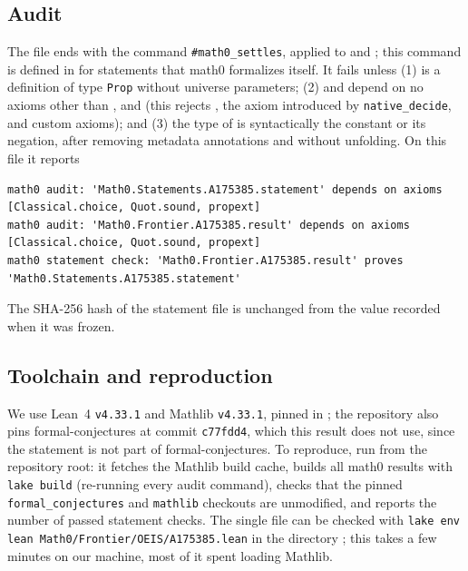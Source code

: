 \documentclass[11pt]{amsart}
\theoremstyle{plain}
\theoremstyle{definition}
\begin{document}
\subsection*{Audit}
The file ends with the command \texttt{\#math0\_settles}, applied to  and ; this command is defined in  for statements that math0 formalizes itself.
It fails unless (1)  is a definition of type \texttt{Prop} without universe parameters; (2)  and  depend on no axioms other than ,  and  (this rejects , the axiom  introduced by \texttt{native\_decide}, and custom axioms); and (3) the type of  is syntactically the constant  or its negation, after removing metadata annotations and without unfolding.
On this file it reports
\begin{lstlisting}
math0 audit: 'Math0.Statements.A175385.statement' depends on axioms [Classical.choice, Quot.sound, propext]
math0 audit: 'Math0.Frontier.A175385.result' depends on axioms [Classical.choice, Quot.sound, propext]
math0 statement check: 'Math0.Frontier.A175385.result' proves 'Math0.Statements.A175385.statement'
\end{lstlisting}
The SHA-256 hash of the statement file is unchanged from the value recorded when it was frozen.

\subsection*{Toolchain and reproduction}
We use Lean~4 \cite{Lean4} \texttt{v4.33.1} and Mathlib \cite{Mathlib} \texttt{v4.33.1}, pinned in ; the repository also pins formal-conjectures \cite{FC} at commit \texttt{c77fdd4}, which this result does not use, since the statement is not part of formal-conjectures.
To reproduce, run  from the repository root: it fetches the Mathlib build cache, builds all math0 results with \texttt{lake build} (re-running every audit command), checks that the pinned \texttt{formal\_conjectures} and \texttt{mathlib} checkouts are unmodified, and reports the number of passed statement checks.
The single file can be checked with \texttt{lake env lean Math0/Frontier/OEIS/A175385.lean} in the directory ; this takes a few minutes on our machine, most of it spent loading Mathlib.
\end{document}
